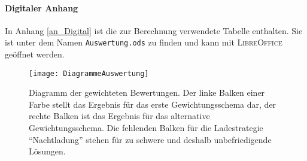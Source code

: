 \paragraph{Digitaler Anhang} In Anhang \ref{an_Digital} ist die zur Berechnung verwendete Tabelle enthalten. Sie ist unter dem Namen \texttt{Auswertung.ods} zu finden und kann mit \textsc{LibreOffice} geöffnet werden.

\begin{figure}\centering
	\texttt{[image: DiagrammeAuswertung]}
	\caption[Diagramm der gewichteten Bewertungen]{Diagramm der gewichteten Bewertungen. Der linke Balken einer Farbe stellt das Ergebnis für das erste Gewichtungsschema dar, der rechte Balken ist das Ergebnis für das alternative Gewichtungsschema. Die fehlenden Balken für die Ladestrategie "`Nachtladung"' stehen für zu schwere und deshalb unbefriedigende Lösungen.}
	\label{abb_DiagrammAuswertung}
\end{figure}

